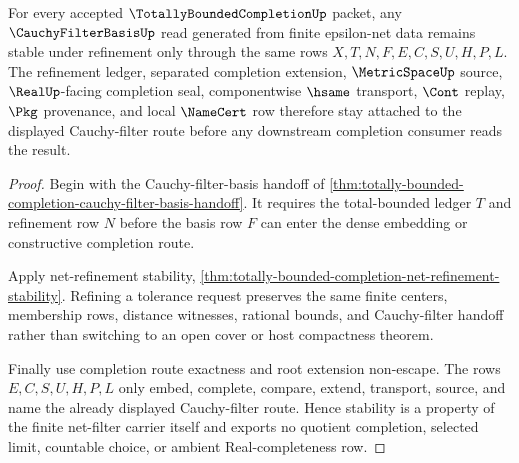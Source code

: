 \begin{theorem}
\label{thm:totally-bounded-completion-cauchy-filter-stability}
For every accepted $\TotallyBoundedCompletionUp$ packet, any $\CauchyFilterBasisUp$ read generated from finite epsilon-net data remains stable under refinement only through the same rows $X,T,N,F,E,C,S,U,H,P,L$. The refinement ledger, separated completion extension, $\MetricSpaceUp$ source, $\RealUp$-facing completion seal, componentwise $\hsame$ transport, $\Cont$ replay, $\Pkg$ provenance, and local $\NameCert$ row therefore stay attached to the displayed Cauchy-filter route before any downstream completion consumer reads the result.
\end{theorem}
\begin{proof}
Begin with the Cauchy-filter-basis handoff of \autoref{thm:totally-bounded-completion-cauchy-filter-basis-handoff}. It requires the total-bounded ledger $T$ and refinement row $N$ before the basis row $F$ can enter the dense embedding or constructive completion route.

Apply net-refinement stability, \autoref{thm:totally-bounded-completion-net-refinement-stability}. Refining a tolerance request preserves the same finite centers, membership rows, distance witnesses, rational bounds, and Cauchy-filter handoff rather than switching to an open cover or host compactness theorem.

Finally use completion route exactness and root extension non-escape. The rows $E,C,S,U,H,P,L$ only embed, complete, compare, extend, transport, source, and name the already displayed Cauchy-filter route. Hence stability is a property of the finite net-filter carrier itself and exports no quotient completion, selected limit, countable choice, or ambient Real-completeness row.
\end{proof}

